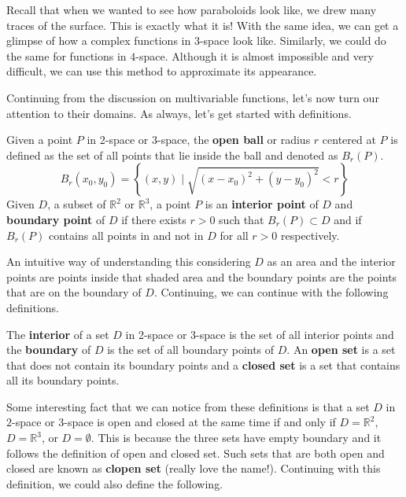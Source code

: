 \documentclass[../../../main.tex]{subfiles}
\begin{document}
Recall that when we wanted to see how paraboloids look like,
we drew many traces of the surface. This is exactly what it is!
With the same idea, we can get a glimpse of how a complex functions
in 3-space look like. Similarly, we could do the same for functions
in $4$-space. Although it is almost impossible and very difficult,
we can use this method to approximate its appearance.

Continuing from the discussion on multivariable functions, let's now
turn our attention to their domains. As always, let's get started with
definitions.

\begin{definition}{}{}
Given a point $P$ in 2-space or 3-space, the \textbf{open ball} or
radius $r$ centered at $P$ is defined as the set of all points that
lie inside the ball and denoted as $B_r(P)$.
\[
B_r (x_0, y_0)
= \left\{
    (x, y) \mid \sqrt{(x - x_0)^2 + (y - y_0)^2} < r
\right\}
\]
Given $D$, a subset of $\mathbb{R}^2$ or $\mathbb{R}^3$, a point $P$
is an \textbf{interior point} of $D$ and \textbf{boundary point} of
$D$ if there exists $r > 0$ such that $B_r(P) \subset D$ and if
$B_r(P)$ contains all points in and not in $D$ for all $r > 0$
respectively.
\end{definition}

An intuitive way of understanding this considering $D$ as an area
and the interior points are points inside that shaded area and the
boundary points are the points that are on the boundary of $D$.
Continuing, we can continue with the following definitions.

\begin{definition}{}{}
The \textbf{interior} of a set $D$ in 2-space or 3-space is the set of
all interior points and the \textbf{boundary} of $D$ is the set of all
boundary points of $D$. An \textbf{open set} is a set that does not
contain its boundary points and a \textbf{closed set} is a set that
contains all its boundary points.
\end{definition}

Some interesting fact that we can notice from these definitions is
that a set $D$ in $2$-space or $3$-space is open and closed at the
same time if and only if $D = \mathbb{R}^2$, $D = \mathbb{R}^3$,
or $D = \emptyset$. This is because the three sets have empty boundary
and it follows the definition of open and closed set. Such sets that
are both open and closed are known as \textbf{clopen set} (really love
the name!). Continuing with this definition, we could also define the
following.
\end{document}
